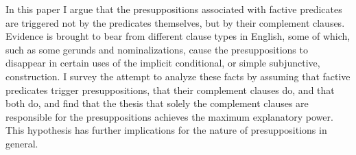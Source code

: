 In this paper I argue that the presuppositions associated with factive predicates are triggered not by the predicates themselves, but by their complement clauses. Evidence is brought to bear from different clause types in English, some of which, such as some gerunds and nominalizations, cause the presuppositions to disappear in certain uses of the implicit conditional, or simple subjunctive, construction. I survey the attempt to analyze these facts by assuming that factive predicates trigger presuppositions, that their complement clauses do, and that both do, and find that the thesis that solely the complement clauses are responsible for the presuppositions achieves the maximum explanatory power. This hypothesis has further implications for the nature of presuppositions in general.
\endinput